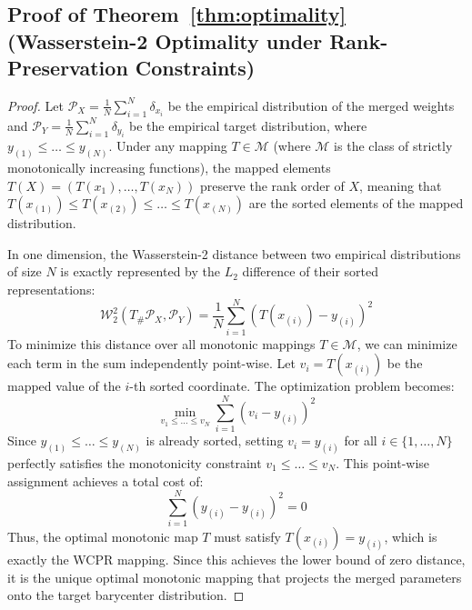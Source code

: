 \documentclass{article}
\theoremstyle{plain}
\theoremstyle{definition}
\theoremstyle{remark}
\begin{document}
\subsection{Proof of Theorem~\ref{thm:optimality} (Wasserstein-2 Optimality under Rank-Preservation Constraints)}
\label{app:proof_optimality}
\begin{proof}
  Let $\mathcal{P}_X = \frac{1}{N}\sum_{i=1}^N \delta_{x_i}$ be the empirical distribution of the merged weights and $\mathcal{P}_Y = \frac{1}{N}\sum_{i=1}^N \delta_{y_i}$ be the empirical target distribution, where $y_{(1)} \leq \dots \leq y_{(N)}$. Under any mapping $T \in \mathcal{M}$ (where $\mathcal{M}$ is the class of strictly monotonically increasing functions), the mapped elements $T(X) = (T(x_1), \dots, T(x_N))$ preserve the rank order of $X$, meaning that $T(x_{(1)}) \leq T(x_{(2)}) \leq \dots \leq T(x_{(N)})$ are the sorted elements of the mapped distribution.
  
  In one dimension, the Wasserstein-2 distance between two empirical distributions of size $N$ is exactly represented by the $L_2$ difference of their sorted representations:
  \begin{equation}
    \mathcal{W}_2^2(T_{\#}\mathcal{P}_X, \mathcal{P}_Y) = \frac{1}{N} \sum_{i=1}^N \left( T(x_{(i)}) - y_{(i)} \right)^2
  \end{equation}
  To minimize this distance over all monotonic mappings $T \in \mathcal{M}$, we can minimize each term in the sum independently point-wise. Let $v_i = T(x_{(i)})$ be the mapped value of the $i$-th sorted coordinate. The optimization problem becomes:
  \begin{equation}
    \min_{v_1 \leq \dots \leq v_N} \sum_{i=1}^N (v_i - y_{(i)})^2
  \end{equation}
  Since $y_{(1)} \leq \dots \leq y_{(N)}$ is already sorted, setting $v_i = y_{(i)}$ for all $i \in \{1, \dots, N\}$ perfectly satisfies the monotonicity constraint $v_1 \leq \dots \leq v_N$. This point-wise assignment achieves a total cost of:
  \begin{equation}
    \sum_{i=1}^N (y_{(i)} - y_{(i)})^2 = 0
  \end{equation}
  Thus, the optimal monotonic map $T$ must satisfy $T(x_{(i)}) = y_{(i)}$, which is exactly the WCPR mapping. Since this achieves the lower bound of zero distance, it is the unique optimal monotonic mapping that projects the merged parameters onto the target barycenter distribution.
\end{proof}
\end{document}
